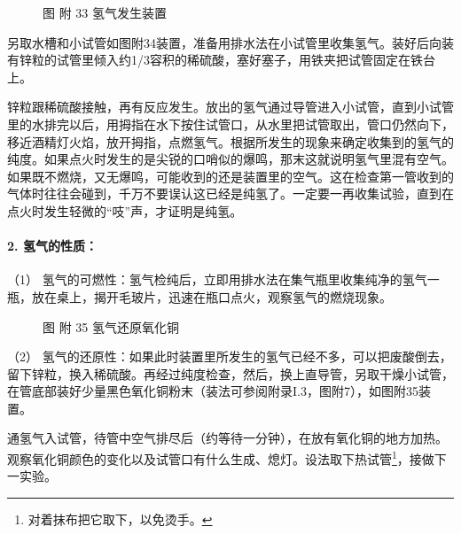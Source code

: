 \begin{figure}
\centering
\caption{图 附 33 氢气发生装置}
\end{figure}

另取水槽和小试管如图附34装置，准备用排水法在小试管里收集氢气。装好后向装有锌粒的试管里倾入约1/3容积的稀硫酸，塞好塞子，用铁夹把试管固定在铁台上。

锌粒跟稀硫酸接触，再有反应发生。放出的氢气通过导管进入小试管，直到小试管里的水排完以后，用拇指在水下按住试管口，从水里把试管取出，管口仍然向下，移近酒精灯火焰，放开拇指，点燃氢气。根据所发生的现象来确定收集到的氢气的纯度。如果点火时发生的是尖锐的口哨似的爆鸣，那末这就说明氢气里混有空气。如果既不燃烧，又无爆鸣，可能收到的还是装置里的空气。这在检查第一管收到的气体时往往会碰到，千万不要误认这已经是纯氢了。一定要一再收集试验，直到在点火时发生轻微的``吱''声，才证明是纯氢。

\paragraph{2. 氢气的性质：}

（1）
氢气的可燃性：氢气检纯后，立即用排水法在集气瓶里收集纯净的氢气一瓶，放在桌上，揭开毛玻片，迅速在瓶口点火，观察氢气的燃烧现象。

\begin{figure}
\centering
\caption{图 附 35 氢气还原氧化铜}
\end{figure}

（2）
氢气的还原性：如果此时装置里所发生的氢气已经不多，可以把废酸倒去，留下锌粒，换入稀硫酸。再经过纯度检查，然后，换上直导管，另取干燥小试管，在管底部装好少量黑色氧化铜粉末（装法可参阅附录I.3，图附7），如图附35装置。

通氢气入试管，待管中空气排尽后（约等待一分钟），在放有氧化铜的地方加热。观察氧化铜颜色的变化以及试管口有什么生成、熄灯。设法取下热试管\footnote{对着抹布把它取下，以免烫手。}，接做下一实验。

